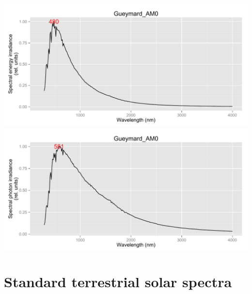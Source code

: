 \documentclass{article}\usepackage[]{graphicx}\usepackage[]{color}
\newenvironment{knitrout}{}{} %
\begin{document}
\begin{knitrout}
{\includegraphics[width=.95\textwidth]{figure/pos-extraterrestrial5} 
\includegraphics[width=.95\textwidth]{figure/pos-extraterrestrial6} 

}



\end{knitrout}


\section{Standard terrestrial solar spectra}
\end{document}
